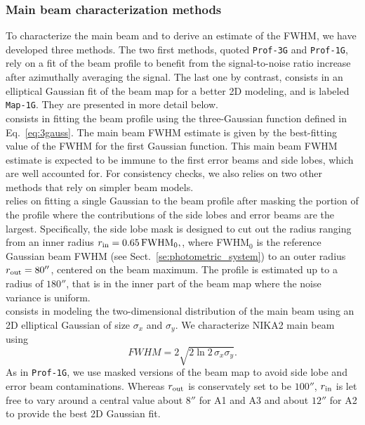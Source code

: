 \subsubsection{Main beam characterization methods}
\label{se:mainbeam_methods}
To characterize the main beam and to derive an estimate of the FWHM, we
have developed three methods. The two first methods, quoted
{\tt Prof-3G} and {\tt Prof-1G}, rely on a fit of the beam profile to
benefit from the signal-to-noise ratio increase after azimuthally
averaging the signal. The last one by contrast,
consists in an elliptical Gaussian fit of the beam map for a better
2D modeling, and is labeled {\tt Map-1G}. They are presented in more
detail below. \\

 consists in fitting the beam profile using the
three-Gaussian function defined in Eq.~\ref{eq:3gauss}.
 The main beam FWHM estimate is given by the best-fitting value
of the FWHM for the first Gaussian function. {\lp This main beam FWHM
estimate is expected to be immune to the first error beams
and side lobes, which are well accounted for. For consistency checks,
we also relies on two other methods that rely on simpler beam models.}\\

 relies on fitting a single Gaussian to the beam
profile after masking the portion of the profile where the
contributions of the side lobes and error beams are the
largest. Specifically, the side lobe mask is designed to cut out {\lp the
radius ranging from an inner radius
$r_{\rm{in}} = 0.65\, \mathrm{FWHM}_0,$, where FWHM$_0$ is the
reference Gaussian beam FWHM (see Sect.~\ref{se:photometric_system})
to an outer radius $r_{\rm{out}} = 80''$,} centered on the beam
maximum.
The profile is estimated up to a radius of
$180''$, that is in the inner part of the beam map where the noise
variance is uniform.\\

 consists in modeling the two-dimensional distribution of
the main beam using an 2D elliptical Gaussian of size $\sigma_x$ and
$\sigma_y$. We characterize NIKA2 main beam using
\begin{equation}
  FWHM = 2 \sqrt{2\ln {2}\, \sigma_x\sigma_y}.
\end{equation}
As in {\tt Prof-1G}, we use masked versions of the
beam map to avoid side lobe and error beam contaminations. 
Whereas $r_{\rm{out}}$ is conservately set to be $100''$,
$r_{\rm{in}}$ is let free to vary around a central value about $8''$
for A1 and A3 and about $12''$ for A2 to provide the best 2D Gaussian
fit.

